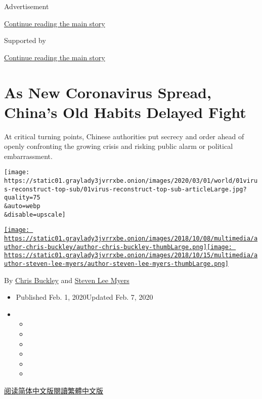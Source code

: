 Advertisement

\protect\hyperlink{after-top}{Continue reading the main story}

Supported by

\protect\hyperlink{after-sponsor}{Continue reading the main story}

\hypertarget{as-new-coronavirus-spread-chinas-old-habits-delayed-fight}{%
\section{As New Coronavirus Spread, China's Old Habits Delayed
Fight}\label{as-new-coronavirus-spread-chinas-old-habits-delayed-fight}}

At critical turning points, Chinese authorities put secrecy and order
ahead of openly confronting the growing crisis and risking public alarm
or political embarrassment.

\texttt{[image: https://static01.graylady3jvrrxbe.onion/images/2020/03/01/world/01virus-reconstruct-top-sub/01virus-reconstruct-top-sub-articleLarge.jpg?quality=75\\\&auto=webp\\\&disable=upscale]}

\href{https://www.nytimes3xbfgragh.onion/by/chris-buckley}{\texttt{[image: https://static01.graylady3jvrrxbe.onion/images/2018/10/08/multimedia/author-chris-buckley/author-chris-buckley-thumbLarge.png]}}\href{https://www.nytimes3xbfgragh.onion/by/steven-lee-myers}{\texttt{[image: https://static01.graylady3jvrrxbe.onion/images/2018/10/15/multimedia/author-steven-lee-myers/author-steven-lee-myers-thumbLarge.png]}}

By \href{https://www.nytimes3xbfgragh.onion/by/chris-buckley}{Chris
Buckley} and
\href{https://www.nytimes3xbfgragh.onion/by/steven-lee-myers}{Steven Lee
Myers}

\begin{itemize}
\item
  Published Feb. 1, 2020Updated Feb. 7, 2020
\item
  \begin{itemize}
  \item
  \item
  \item
  \item
  \item
  \item
  \end{itemize}
\end{itemize}

\href{https://cn.nytimes3xbfgragh.onion/china/20200203/china-coronavirus/}{阅读简体中文版}\href{https://cn.nytimes3xbfgragh.onion/china/20200203/china-coronavirus/zh-hant/}{閱讀繁體中文版}

